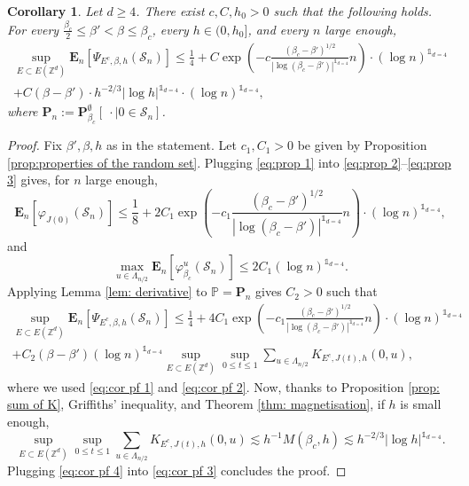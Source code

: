 \documentclass[11pt,a4paper]{article}
\numberwithin{equation}{section}
\theoremstyle{plain}
\newtheorem{Coro}[Thm]{Corollary}
\theoremstyle{definition}
\begin{document}
\begin{Coro}\label{coro:bound on psi} Let $d\geq 4$. There exist $c,C,h_0>0$ such that the following holds. For every $\tfrac{\beta_c}{2}\leq \beta'< \beta\leq \beta_c$, every $h\in (0,h_0]$, and every $n$ large enough,
\begin{multline}
	\sup_{E\subset E(\mathbb Z^d)}\mathbf E_n[\Psi_{E^c,\beta,h}(\mathcal S_n)]\leq \frac{1}{4}+ C\exp\left(-c\frac{(\beta_c-\beta')^{1/2}}{|\log (\beta_c-\beta')|^{\mathds{1}_{d=4}}}n\right)\cdot (\log n)^{\mathds{1}_{d=4}}
	\\+C(\beta-\beta')\cdot h^{-2/3}|\log h|^{\mathds{1}_{d=4}}\cdot (\log n)^{\mathds{1}_{d=4}},
\end{multline}
where $\mathbf P_n:=\mathbf P^\emptyset_{\beta_c}[\:\cdot \mid 0\in \mathcal S_n]$.
\end{Coro}
\begin{proof} Fix $\beta',\beta,h$ as in the statement. Let $c_1,C_1>0$ be given by Proposition \ref{prop:properties of the random set}. Plugging \eqref{eq:prop 1} into \eqref{eq:prop 2}--\eqref{eq:prop 3} gives, for $n$ large enough,
\begin{equation}\label{eq:cor pf 1}
	\mathbf E_n[\varphi_{J(0)}(\mathcal S_n)]\leq \frac{1}{8}+2C_1\exp\left(-c_1\frac{(\beta_c-\beta')^{1/2}}{|\log (\beta_c-\beta')|^{\mathds{1}_{d=4}}} n\right)\cdot (\log n)^{\mathds{1}_{d=4}},
\end{equation}
and
\begin{equation}\label{eq:cor pf 2}
		\max_{u\in \Lambda_{n/2}}\mathbf E_n[\varphi_{\beta_c}^u(\mathcal S_n)]\leq 2C_1(\log n)^{\mathds{1}_{d=4}}.
\end{equation}
Applying Lemma \ref{lem: derivative} to $\mathbb P=\mathbf P_n$ gives $C_2>0$ such that
\begin{multline}\label{eq:cor pf 3}
	\sup_{E\subset E(\mathbb Z^d)}\mathbf E_n[\Psi_{E^c,\beta,h}(\mathcal S_n)]\leq \frac{1}{4}+4C_1\exp\left(-c_1\frac{(\beta_c-\beta')^{1/2}}{|\log (\beta_c-\beta')|^{\mathds{1}_{d=4}}} n\right)\cdot (\log n)^{\mathds{1}_{d=4}}
	\\+C_2(\beta-\beta') (\log n)^{\mathds{1}_{d=4}} \sup_{E\subset E(\mathbb Z^d)}\sup_{0\leq t\leq 1}\sum_{u\in \Lambda_{n/2}}K_{E^c,J(t),h}(0,u),
\end{multline}
where we used \eqref{eq:cor pf 1} and \eqref{eq:cor pf 2}. Now, thanks to Proposition \ref{prop: sum of K}, Griffiths' inequality, and Theorem \ref{thm: magnetisation}, if $h$ is small enough,
\begin{equation}\label{eq:cor pf 4}
	\sup_{E\subset E(\mathbb Z^d)}\sup_{0\leq t\leq 1}\sum_{u\in \Lambda_{n/2}}K_{E^c,J(t),h}(0,u)\lesssim h^{-1} M(\beta_c,h)\lesssim h^{-2/3}|\log h|^{\mathds{1}_{d=4}}.
\end{equation} 
		Plugging \eqref{eq:cor pf 4} into \eqref{eq:cor pf 3} concludes the proof.
\end{proof}
\end{document}
